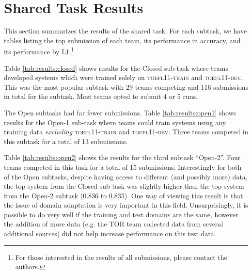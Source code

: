 \documentclass[11pt,letterpaper]{article}
\begin{document}
\section{Shared Task Results}
\label{sec-results}
This section summarizes the results of the shared task.  For each subtask,
we have tables listing the top submission of each team, its performance in
accuracy, and its performance by L1.\footnote{For those interested in
the results of all submissions, please contact the authors.}

Table \ref{tab:results:closed} shows results for the Closed sub-task where teams
developed systems which were trained solely on \textsc{toefl11-train} and \textsc{toefl11-dev}.  This
was the most popular subtask with 29 teams competing and 116 submissions in total
for the subtask.  Most teams opted to submit 4 or 5 runs.



The Open subtasks had far fewer submissions.  Table \ref{tab:results:open1} shows
results for the Open-1 sub-task where teams could train systems using any training
data {\it excluding} \textsc{toefl11-train} and \textsc{toefl11-dev}.  Three teams competed in this
subtask for a total of 13 submissions.

Table \ref{tab:results:open2} shows the results for the third subtask ``Open-2''.  Four
teams competed in this task for a total of 15 submissions.  Interestingly for both
of the Open subtasks, despite having access to different (and possibly more) data, the
top system from the Closed sub-task was slightly higher than the top system from the
Open-2 subtask (0.836 to 0.835).  One way of viewing this result is that %
the issue of domain adaptation is very important in this field. Unsurprisingly, it is possible 
to do very well if the training and test domains are the same, however the addition of more data 
(e.g. the TOR team collected data from several additional sources) did not help increase
performance on this test data. 
\end{document}
